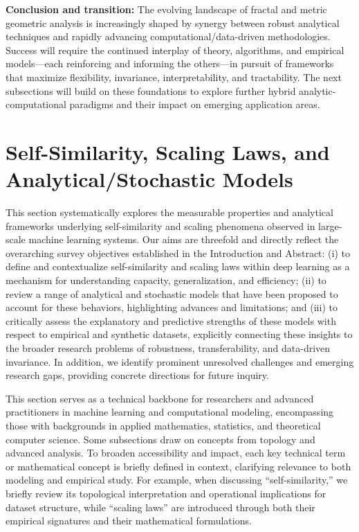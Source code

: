 \documentclass[sigconf]{acmart}
\begin{document}
\textbf{Conclusion and transition:}
The evolving landscape of fractal and metric geometric analysis is increasingly shaped by synergy between robust analytical techniques and rapidly advancing computational/data-driven methodologies. Success will require the continued interplay of theory, algorithms, and empirical models—each reinforcing and informing the others—in pursuit of frameworks that maximize flexibility, invariance, interpretability, and tractability. The next subsections will build on these foundations to explore further hybrid analytic-computational paradigms and their impact on emerging application areas.

\section{Self-Similarity, Scaling Laws, and Analytical/Stochastic Models}

This section systematically explores the measurable properties and analytical frameworks underlying self-similarity and scaling phenomena observed in large-scale machine learning systems. Our aims are threefold and directly reflect the overarching survey objectives established in the Introduction and Abstract: (i) to define and contextualize self-similarity and scaling laws within deep learning as a mechanism for understanding capacity, generalization, and efficiency; (ii) to review a range of analytical and stochastic models that have been proposed to account for these behaviors, highlighting advances and limitations; and (iii) to critically assess the explanatory and predictive strengths of these models with respect to empirical and synthetic datasets, explicitly connecting these insights to the broader research problems of robustness, transferability, and data-driven invariance. In addition, we identify prominent unresolved challenges and emerging research gaps, providing concrete directions for future inquiry.

This section serves as a technical backbone for researchers and advanced practitioners in machine learning and computational modeling, encompassing those with backgrounds in applied mathematics, statistics, and theoretical computer science. Some subsections draw on concepts from topology and advanced analysis. To broaden accessibility and impact, each key technical term or mathematical concept is briefly defined in context, clarifying relevance to both modeling and empirical study. For example, when discussing ``self-similarity,'' we briefly review its topological interpretation and operational implications for dataset structure, while ``scaling laws'' are introduced through both their empirical signatures and their mathematical formulations.
\end{document}
